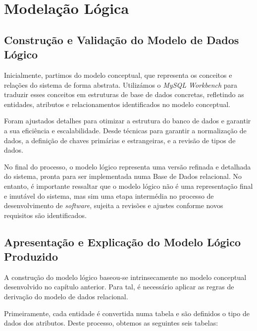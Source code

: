 \documentclass[a4paper,12pt]{scrreprt}
\begin{document}
\chapter{Modelação Lógica}
    \section{Construção e Validação do Modelo de Dados Lógico}

               Inicialmente, partimos do modelo conceptual, que representa os conceitos e relações do sistema de forma abstrata. Utilizámos o \textit{MySQL Workbench} para traduzir esses conceitos em estruturas de base de dados concretas, refletindo as entidades, atributos e relacionamentos identificados no modelo conceptual.

        Foram ajustados detalhes para otimizar a estrutura do banco de dados e garantir a sua eficiência e escalabilidade. Desde técnicas para garantir a normalização de dados, a definição de chaves primárias e estrangeiras, e a revisão de tipos de dados.
    
        No final do processo, o modelo lógico representa uma versão refinada e detalhada do sistema, pronta para ser implementada numa Base de Dados relacional. No entanto, é importante ressaltar que o modelo lógico não é uma representação final e imutável do sistema, mas sim uma etapa intermédia no processo de desenvolvimento de \textit{software}, sujeita a revisões e ajustes conforme novos requisitos são identificados.
        
    \clearpage
        
    \section{Apresentação e Explicação do Modelo Lógico Produzido}
        
        A construção do modelo lógico baseou-se intrinsecamente no modelo conceptual desenvolvido no capítulo anterior. Para tal, é necessário aplicar as regras de derivação do modelo de dados relacional.

        Primeiramente, cada entidade é convertida numa tabela e são definidos o tipo de dados dos atributos. Deste processo, obtemos as seguintes seis tabelas:
\end{document}
